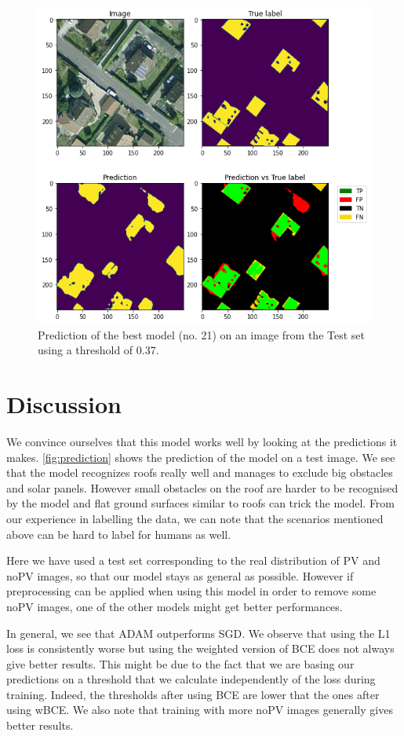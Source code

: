\documentclass[10pt,conference]{IEEEtran}
\begin{document}
\begin{figure}[tbp]
    \centering
    \includegraphics[width=.85\columnwidth]{report/images/prediction.png}
    \caption{Prediction of the best model (no. 21) on an image from the Test set using a threshold of 0.37.}
    \label{fig:prediction}
\end{figure}

\section{Discussion}
We convince ourselves that this model works well by looking at the predictions it makes. \autoref{fig:prediction} shows the prediction of the model on a test image.
We see that the model recognizes roofs really well and manages to exclude big obstacles and solar panels. However small obstacles on the roof are harder to be recognised by the model and flat ground surfaces similar to roofs can trick the model. From our experience in labelling the data, we can note that the scenarios mentioned above can be hard to label for humans as well.

Here we have used a test set corresponding to the real distribution of PV and noPV images, so that our model stays as general as possible. However if preprocessing can be applied when using this model in order to remove some noPV images, one of the other models might get better performances.

In general, we see that ADAM outperforms SGD.
We observe that using the L1 loss is consistently worse but using the weighted version of BCE does not always give better results. This might be due to the fact that we are basing our predictions on a threshold that we calculate independently of the loss during training. Indeed, the thresholds after using BCE are lower that the ones after using wBCE. 
We also note that training with more noPV images generally gives better results.
\end{document}
